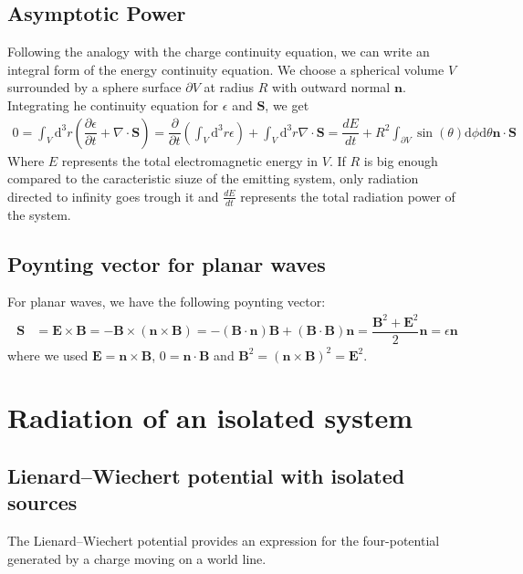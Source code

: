 \documentclass[10pt, a4paper]{article}
\begin{document}
{\subsection{Asymptotic Power}
Following the analogy with the charge continuity equation, we can write an integral form of the energy continuity equation. We choose a spherical volume $V$ surrounded by a sphere surface $\partial V$ at radius $R$ with outward normal $\mathbf{n}$. Integrating he continuity equation for $\epsilon$ and $\mathbf{S}$, we get 
\begin{align*}
   0 = \int_V \text{d}^3 r \left(\dfrac{\partial \epsilon}{\partial t} + \nabla  \cdot \mathbf{S}\right) = \dfrac{\partial }{\partial t} \left(\int_V \text{d}^3 r \epsilon\right) + \int_V \text{d}^3 r \nabla  \cdot \mathbf{S} = \dfrac{d E}{d t}  + R^2\int_{\partial V} \sin(\theta) \text{d}\phi \text{d}\theta \mathbf{n} \cdot \mathbf{S}
\end{align*}
Where $E$ represents the total electromagnetic energy in $V$. If $R$ is big enough compared to the caracteristic siuze of the emitting system, only radiation directed to infinity goes trough it and $\frac{dE}{dt}$ represents the total radiation power of the system. 

\subsection{Poynting vector for planar waves}
For planar waves, we have the following poynting vector:
\begin{align*}
    \mathbf{S} &= \mathbf{E}\times\mathbf{B} = -\mathbf{B} \times (\mathbf{n} \times \mathbf{B}) =- (\mathbf{B} \cdot \mathbf{n}) \mathbf{B} + (\mathbf{B} \cdot \mathbf{B}) \mathbf{n} = \dfrac{\mathbf{B}^2 + \mathbf{E}^2}{2} \mathbf{n} = \epsilon \mathbf{n} 
\end{align*}
where we used $\mathbf{E} = \mathbf{n} \times \mathbf{B}$, $0 = \mathbf{n} \cdot \mathbf{B}$ and $\mathbf{B}^2 = (\mathbf{n} \times \mathbf{B})^2 =  \mathbf{E}^2$. 
\section{Radiation of an isolated system}
\subsection{Lienard–Wiechert potential with isolated sources}
The Lienard–Wiechert potential provides an expression for the four-potential generated by a charge moving on a world line. 

}
\end{document}
